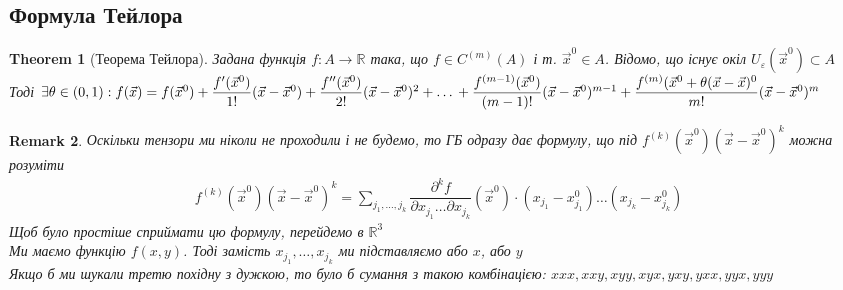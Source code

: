 \documentclass[a4paper, 14pt]{extarticle}
\theoremstyle{theoremdd}
\newtheorem{theorem}{Theorem}[subsection]
\theoremstyle{theoremdd}
\theoremstyle{theoremdd}
\theoremstyle{theoremdd}
\newtheorem{remark}[theorem]{Remark}
\theoremstyle{theoremdd}
\theoremstyle{theoremdd}
\theoremstyle{theoremdd}
\begin{document}
\subsection{Формула Тейлора}
\begin{theorem}[Теорема Тейлора]
Задана функція $f: A \to \mathbb{R}$ така, що $f \in C^{(m)}(A)$ і т. $\vec{x}^0 \in A$. Відомо, що існує окіл $U_{\varepsilon}(\vec{x}^0) \subset A$\\
Тоді $\exists \theta \in (0,1): f(\vec{x}) = f(\vec{x}^0) + \dfrac{f'(\vec{x}^0)}{1!}(\vec{x}-\vec{x}^0) + \dfrac{f''(\vec{x}^0)}{2!}(\vec{x}-\vec{x}^0)^2 + \dots \\ + \dfrac{f^{(m-1)}(\vec{x}^0)}{(m-1)!}(\vec{x}-\vec{x}^0)^{m-1} + \dfrac{f^{(m)}(\vec{x}^0+\theta(\vec{x}-\vec{x})^0}{m!}(\vec{x}-\vec{x}^0)^m$
\end{theorem}
\begin{remark}
Оскільки тензори ми ніколи не проходили і не будемо, то ГБ одразу дає формулу, що під $f^{(k)}(\vec{x}^0)(\vec{x}-\vec{x}^0)^k$ можна розуміти
\begin{align*}
f^{(k)}(\vec{x}^0)(\vec{x}-\vec{x}^0)^k = \sum_{j_1,\dots,j_k} \dfrac{\partial^k f}{\partial x_{j_1}\dots \partial x_{j_k}}(\vec{x}^0) \cdot (x_{j_1}-x_{j_1}^0) \dots (x_{j_k}-x_{j_k}^0)
\end{align*}
Щоб було простіше сприймати цю формулу, перейдемо в $\mathbb{R}^3$\\
Ми маємо функцію $f(x,y)$. Тоді замість $x_{j_1},\dots,x_{j_k}$ ми підставляємо або $x$, або $y$\\
Якщо б ми шукали третю похідну з дужкою, то було б сумання з такою комбінацією: $xxx, xxy, xyy, xyx, yxy, yxx, yyx, yyy$
\end{remark}
\end{document}
